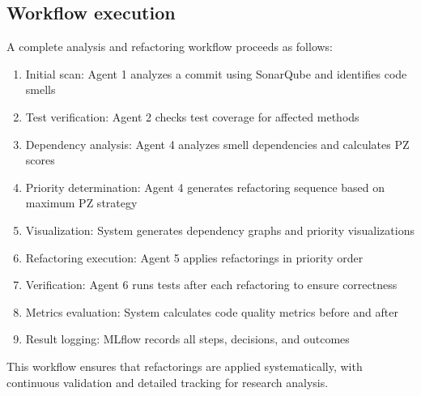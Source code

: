 \subsection{Workflow execution}

A complete analysis and refactoring workflow proceeds as follows:

\begin{enumerate}
    \item Initial scan: Agent 1 analyzes a commit using SonarQube and identifies code smells
    \item Test verification: Agent 2 checks test coverage for affected methods
    \item Dependency analysis: Agent 4 analyzes smell dependencies and calculates PZ scores
    \item Priority determination: Agent 4 generates refactoring sequence based on maximum PZ strategy
    \item Visualization: System generates dependency graphs and priority visualizations
    \item Refactoring execution: Agent 5 applies refactorings in priority order
    \item Verification: Agent 6 runs tests after each refactoring to ensure correctness
    \item Metrics evaluation: System calculates code quality metrics before and after
    \item Result logging: MLflow records all steps, decisions, and outcomes
\end{enumerate}

This workflow ensures that refactorings are applied systematically, with continuous validation and detailed tracking for research analysis.
